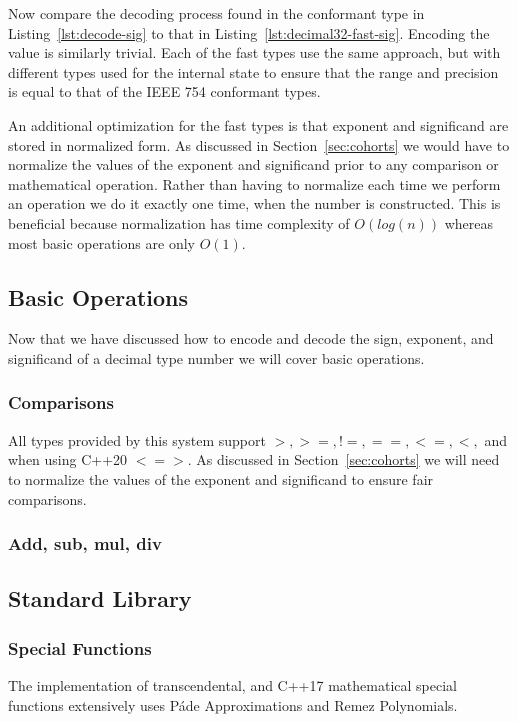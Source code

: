 \documentclass[acmsmall]{acmart}
\begin{document}
Now compare the decoding process found in the conformant type in Listing~\ref{lst:decode-sig} to that in Listing~\ref{lst:decimal32-fast-sig}.
Encoding the value is similarly trivial.
Each of the fast types use the same approach, but with different types used for the internal state to ensure that the range and precision is equal to that of the IEEE 754 conformant types.

An additional optimization for the fast types is that exponent and significand are stored in normalized form.
As discussed in Section~\ref{sec:cohorts} we would have to normalize the values of the exponent and significand prior to any comparison or mathematical operation.
Rather than having to normalize each time we perform an operation we do it exactly one time, when the number is constructed.
This is beneficial because normalization has time complexity of $O(log(n))$ whereas most basic operations are only $O(1)$.

\subsection{Basic Operations}

Now that we have discussed how to encode and decode the sign, exponent, and significand of a decimal type number we will cover basic operations.

\subsubsection{Comparisons}

All types provided by this system support $>, >=, !=, ==, <=, <,$ and when using C++20 $<=>$.
As discussed in Section~\ref{sec:cohorts} we will need to normalize the values of the exponent and significand to ensure fair comparisons.

\subsubsection{Add, sub, mul, div}

\subsection{Standard Library}

\subsubsection{Special Functions}

The implementation of transcendental, and C++17 mathematical special functions\cite{cppreference_special_functions}\cite{iso_cpp23} extensively uses Páde Approximations and Remez Polynomials.
\end{document}
